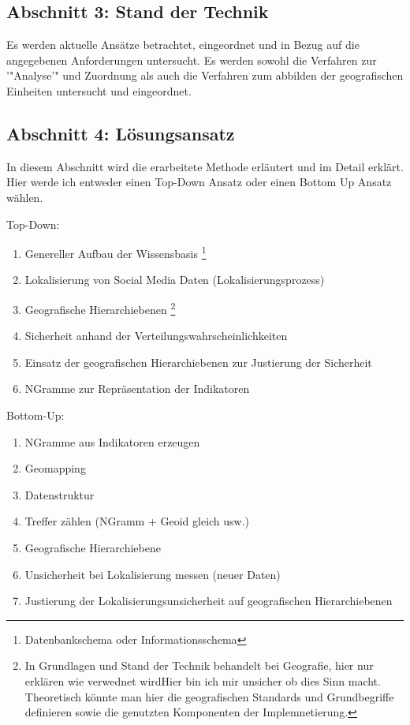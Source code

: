 		\subsection*{Abschnitt 3: Stand der Technik}
			Es werden aktuelle Ansätze betrachtet, eingeordnet und in Bezug auf die angegebenen Anforderungen untersucht.
			Es werden sowohl die Verfahren zur '"Analyse'" und Zuordnung als auch die Verfahren zum abbilden der geografischen Einheiten untersucht und eingeordnet. 

		\subsection*{Abschnitt 4: Lösungsansatz}
			In diesem Abschnitt wird die erarbeitete Methode erläutert und im Detail erklärt. 
			Hier werde ich entweder einen Top-Down Ansatz oder einen Bottom Up Ansatz wählen.

			Top-Down:
			\begin{enumerate}
				\item Genereller Aufbau der Wissensbasis \footnote{Datenbankschema oder Informationsschema} 
				\item Lokalisierung von Social Media Daten (Lokalisierungsprozess) 
				\item Geografische Hierarchiebenen \footnote{In Grundlagen und Stand der Technik behandelt bei Geografie, hier nur erklären wie verwednet wirdHier bin ich mir unsicher ob dies Sinn macht. 
			Theoretisch könnte man hier die geografischen Standards und Grundbegriffe definieren sowie die genutzten Komponenten der Implemnetierung.}
				\item Sicherheit anhand der Verteilungswahrscheinlichkeiten
				\item Einsatz der geografischen Hierarchiebenen zur Justierung der Sicherheit    
				\item NGramme zur Repräsentation der Indikatoren
			\end{enumerate}

			Bottom-Up:

			\begin{enumerate}
				\item NGramme aus Indikatoren erzeugen
				\item Geomapping
				\item Datenstruktur
				\item Treffer zählen (NGramm + Geoid gleich usw.)
				\item Geografische Hierarchiebene
				\item Unsicherheit bei Lokalisierung messen (neuer Daten) 
				\item Justierung der Lokalisierungsunsicherheit auf geografischen Hierarchiebenen
			\end{enumerate}


